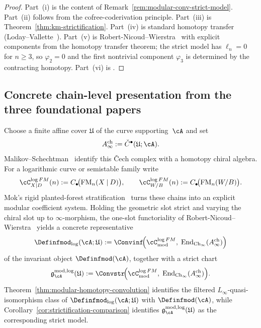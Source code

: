 \begin{proof}
Part~(i) is the content of
Remark~\ref{rem:modular-conv-strict-model}.
Part~(ii) follows from the cofree-coderivation principle.
Part~(iii) is Theorem~\ref{thm:km-strictification}.
Part~(iv) is standard homotopy transfer
(Loday--Vallette~\cite[Thm~10.3.1]{LV12}).
Part~(v) is Robert-Nicoud--Wierstra~\cite[Thm~5.1]{RNW19}
with explicit components from the homotopy transfer
theorem; the strict model has $\ell_n = 0$ for $n \geq 3$,
so $\varphi_2 = 0$ and the first nontrivial component
$\varphi_3$ is determined by the contracting homotopy.
Part~(vi) is \cite[Theorem~6.6]{RNW19}.
\end{proof}


\subsection{Concrete chain-level presentation from the three foundational papers}
\label{subsec:three-preprints-chain-level}

\begin{construction}
\label{constr:three-preprints-chain-level}
Choose a finite affine cover $\mathfrak U$ of the curve supporting~$\cA$ and set
\[
A^{\mathrm{ch}}_\infty := \check C^\bullet(\mathfrak U;\cA).
\]
Malikov--Schechtman~\cite{MS24} identify this \v{C}ech complex with a
homotopy chiral algebra.  For a logarithmic curve or semistable family write
\[
\cC^{\log FM}_{X\mathbin{|}D}(n):=C_\bullet\!\bigl(\operatorname{FM}_n(X\mathbin{|}D)\bigr),
\qquad
\cC^{\log FM}_{W/B}(n):=C_\bullet\!\bigl(\operatorname{FM}_n(W/B)\bigr).
\]
Mok's rigid planted-forest stratification~\cite{Mok25} turns these chains into
an explicit modular coefficient system.  Holding the geometric slot strict and
varying the chiral slot up to $\infty$-morphism, the one-slot functoriality of
Robert-Nicoud--Wierstra~\cite{RNW19} yields a concrete representative
\[
\Definfmod_{\log}(\cA;\mathfrak U)
:=
\Convinf\!\Bigl(
\cC^{\log FM}_{\mathrm{mod}},\;
\operatorname{End}_{\mathrm{Ch}_\infty}(A^{\mathrm{ch}}_\infty)
\Bigr)
\]
of the invariant object $\Definfmod(\cA)$, together with a strict chart
\[
\mathfrak g^{\mathrm{mod,log}}_{\cA}(\mathfrak U)
:=
\Convstr\!\Bigl(
\cC^{\log FM}_{\mathrm{mod}},\;
\operatorname{End}_{\mathrm{Ch}_\infty}(A^{\mathrm{ch}}_\infty)
\Bigr).
\]
Theorem~\ref{thm:modular-homotopy-convolution} identifies the filtered
$L_\infty$-quasi-isomorphism class of
$\Definfmod_{\log}(\cA;\mathfrak U)$ with $\Definfmod(\cA)$, while
Corollary~\ref{cor:strictification-comparison} identifies
$\mathfrak g^{\mathrm{mod,log}}_{\cA}(\mathfrak U)$ as the corresponding
strict model.
\end{construction}

